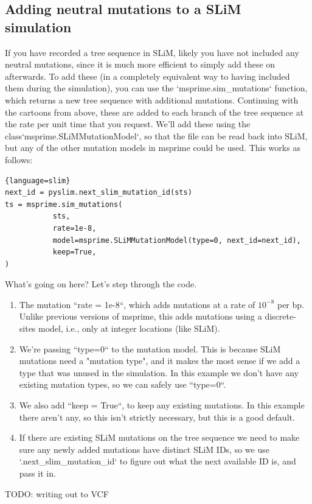 \documentclass[12pt]{article}
\begin{document}
\subsection*{Adding neutral mutations to a SLiM simulation}


If you have recorded a tree sequence in SLiM, likely you have not included any neutral mutations,
since it is much more efficient to simply add these on afterwards.
To add these (in a completely equivalent way to having included them during the simulation),
you can use the `msprime.sim\_mutations` function, which returns a new tree sequence with additional mutations.
Continuing with the cartoons from above, these are added to each branch of the tree sequence
at the rate per unit time that you request.
We'll add these using the {class}`msprime.SLiMMutationModel`, so that the file can be read back into SLiM,
but any of the other mutation models in msprime could be used.
This works as follows:
\begin{lstlisting}{language=slim}
next_id = pyslim.next_slim_mutation_id(sts)
ts = msprime.sim_mutations(
           sts,
           rate=1e-8,
           model=msprime.SLiMMutationModel(type=0, next_id=next_id),
           keep=True,
)
\end{lstlisting}


What's going on here? Let's step through the code.

\begin{enumerate}
    \item The mutation ``rate = 1e-8``, which adds mutations at a rate of $10^{-8}$ per bp.
    Unlike previous versions of msprime, this adds mutations using a discrete-sites model,
    i.e., only at integer locations (like SLiM).

\item We're passing ``type=0`` to the mutation model.
    This is because SLiM mutations need a "mutation type",
    and it makes the most sense if we add a type that was unused in the simulation.
    In this example we don't have any existing mutation types, so we can safely use ``type=0``.

\item We also add ``keep = True``, to keep any existing mutations.
    In this example there aren't any, so this isn't strictly necessary,
    but this is a good default.

\item If there are existing SLiM mutations on the tree sequence we need to
    make sure any newly added mutations have distinct SLiM IDs,
    so we use `.next\_slim\_mutation\_id` to figure out
    what the next available ID is, and pass it in.

\end{enumerate}

TODO: writing out to VCF
\end{document}

